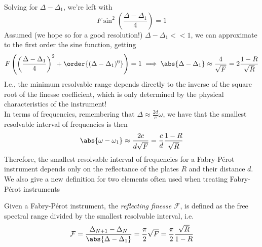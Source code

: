 \documentclass[../electromagnetism.tex]{subfiles}
\begin{document}
Solving for $\Delta-\Delta_1$, we're left with
\begin{equation*}
	F\sin^2\left( \frac{\Delta-\Delta_1}{4} \right)=1
\end{equation*}
Assumed (we hope so for a good resolution!) $\Delta-\Delta_1<<1$, we can approximate to the first order the sine function, getting
\begin{equation}
	F\left( \left(\frac{\Delta-\Delta_1}{4}\right)^2+\order{ (\Delta-\Delta_1)^6} \right)=1\implies\abs{\Delta-\Delta_1}\approx\frac{4}{\sqrt{F}}=2\frac{1-R}{\sqrt{R}}
	\label{eq:rayleighcritfpi}
\end{equation}
I.e., the minimum resolvable range depends directly to the inverse of the square root of the finesse coefficient, which is only determined by the physical characteristics of the instrument!\\
In terms of frequencies, remembering that $\Delta\approx\frac{2d}{c}\omega$, we have that the smallest resolvable interval of frequencies is then
\begin{equation}
	\abs{\omega-\omega_1}\approx\frac{2c}{d\sqrt{F}}=\frac{c}{d}\frac{1-R}{\sqrt{R}}
	\label{eq:minresolvableintfreq}
\end{equation}
Therefore, the smallest resolvable interval of frequencies for a Fabry-Pérot instrument depends only on the reflectance of the plates $R$ and their distance $d$.\\
We also give a new definition for two elements often used when treating Fabry-Pérot instruments
\begin{dfn}
	Given a Fabry-Pérot instrument, the \emph{reflecting finesse} $\mathcal{F}$, is defined as the free spectral range divided by the smallest resolvable interval, i.e.
	\begin{equation}
		\mathcal{F}=\frac{\Delta_{N+1}-\Delta_N}{\abs{\Delta-\Delta_1}}=\frac{\pi}{2}\sqrt{F}=\frac{\pi}{2}\frac{\sqrt{R}}{1-R}
		\label{eq:reflectingfinesse}
	\end{equation}
\end{dfn}
\end{document}
